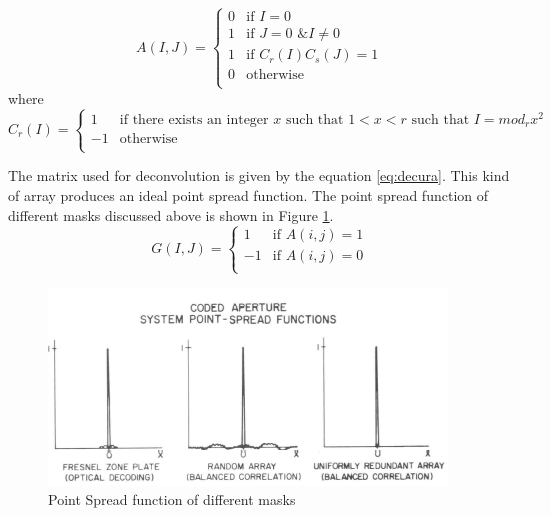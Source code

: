 \begin{equation}
  A(I,J) =
  \begin{cases}
    0 & \text{if $I = 0$} \\
    1 & \text{if $J = 0$ \& $I\neq 0$} \\
    1 & \text{if $C_r(I)C_s(J) = 1$} \\
    0 & \text{otherwise}\\
  \end{cases}
  \label{eq:ura}
\end{equation}
where
\begin{equation}
  C_r(I) =
  \begin{cases}
    1 & \text{if there exists an integer $x$ such that 
    $1<x<r$ 
	such that $I = mod_rx^2$    
    } \\
    -1 & \text{otherwise} \\
  \end{cases}
  \label{eq:ura}
\end{equation}

The matrix used for deconvolution is given by the equation \ref{eq:decura}. This kind of array produces an ideal point spread function. The point spread function of different masks discussed above is shown in Figure \ref{fig:psf_old_mask}.
\begin{equation}
  G(I,J) =
  \begin{cases}
    1 & \text{if $A(i,j) = 1$} \\
    -1 & \text{if $A(i,j) = 0$} \\
  \end{cases}
  \label{eq:decura}
\end{equation}

\begin{figure}[ht]
\includegraphics[width=\textwidth]{pics/psf_mask}
\caption{Point Spread function of different masks\cite{Fenimore:78}}
\label{fig:psf_old_mask}
\end{figure}

